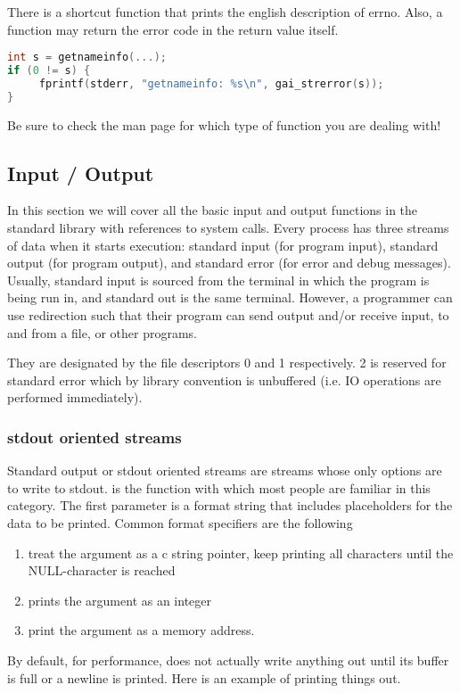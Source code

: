 There is a shortcut function  that prints the english description of errno.
Also, a function may return the error code in the return value itself.

\begin{lstlisting}[language=C]
int s = getnameinfo(...);
if (0 != s) {
     fprintf(stderr, "getnameinfo: %s\n", gai_strerror(s));
}
\end{lstlisting}

Be sure to check the man page for which type of function you are dealing with!

\subsection{Input / Output}

In this section we will cover all the basic input and output functions in the standard library with references to system calls.
Every process has three streams of data when it starts execution: standard input (for program input), standard output (for program output), and standard error (for error and debug messages).
Usually, standard input is sourced from the terminal in which the program is being run in, and standard out is the same terminal.
However, a programmer can use redirection such that their program can send output and/or receive input, to and from a file, or other programs.

They are designated by the file descriptors 0 and 1 respectively. 2 is reserved for standard error which by library convention is unbuffered (i.e. IO operations are performed immediately).

\subsubsection{stdout oriented streams}

Standard output or stdout oriented streams are streams whose only options are to write to stdout.
 is the function with which most people are familiar in this category.
The first parameter is a format string that includes placeholders for the data to be printed.
Common format specifiers are the following
\begin{enumerate}
\item {} treat the argument as a c string pointer, keep printing all characters until the NULL-character is reached
\item {} prints the argument as an integer
  \item {} print the argument as a memory address.
    \end{enumerate}
By default, for performance,  does not actually write anything out until its buffer is full or a newline is printed.
Here is an example of printing things out.

